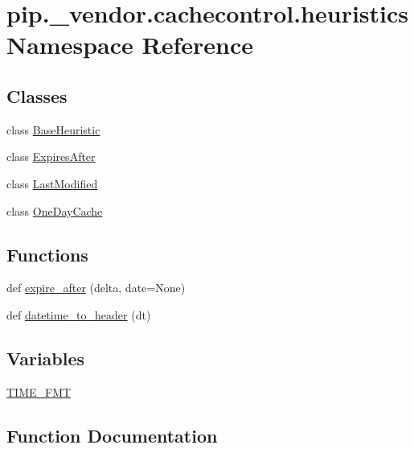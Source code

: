 \hypertarget{namespacepip_1_1__vendor_1_1cachecontrol_1_1heuristics}{}\section{pip.\+\_\+vendor.\+cachecontrol.\+heuristics Namespace Reference}
\label{namespacepip_1_1__vendor_1_1cachecontrol_1_1heuristics}
\subsection*{Classes}
\begin{DoxyCompactItemize}
\item 
class \hyperlink{classpip_1_1__vendor_1_1cachecontrol_1_1heuristics_1_1BaseHeuristic}{Base\+Heuristic}
\item 
class \hyperlink{classpip_1_1__vendor_1_1cachecontrol_1_1heuristics_1_1ExpiresAfter}{Expires\+After}
\item 
class \hyperlink{classpip_1_1__vendor_1_1cachecontrol_1_1heuristics_1_1LastModified}{Last\+Modified}
\item 
class \hyperlink{classpip_1_1__vendor_1_1cachecontrol_1_1heuristics_1_1OneDayCache}{One\+Day\+Cache}
\end{DoxyCompactItemize}
\subsection*{Functions}
\begin{DoxyCompactItemize}
\item 
def \hyperlink{namespacepip_1_1__vendor_1_1cachecontrol_1_1heuristics_aa58917f20882311b8dfb4e7990e50849}{expire\+\_\+after} (delta, date=None)
\item 
def \hyperlink{namespacepip_1_1__vendor_1_1cachecontrol_1_1heuristics_ae24cdc2808eb97b2ea9c2d5461dcbcfd}{datetime\+\_\+to\+\_\+header} (dt)
\end{DoxyCompactItemize}
\subsection*{Variables}
\begin{DoxyCompactItemize}
\item 
\hyperlink{namespacepip_1_1__vendor_1_1cachecontrol_1_1heuristics_aa7eaa0e303b5a442b1ebacdd211c814b}{T\+I\+M\+E\+\_\+\+F\+MT}
\end{DoxyCompactItemize}


\subsection{Function Documentation}
\mbox{\label{namespacepip_1_1__vendor_1_1cachecontrol_1_1heuristics_ae24cdc2808eb97b2ea9c2d5461dcbcfd}} 
